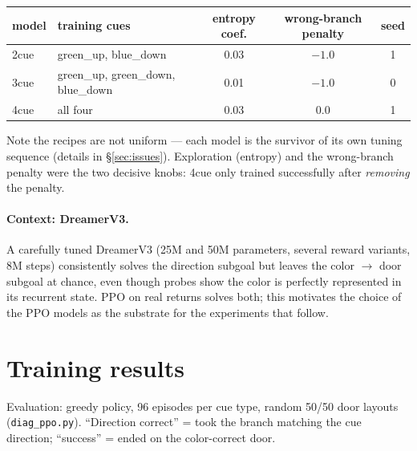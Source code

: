 \documentclass[11pt]{article}
\newcommand{\bad}[1]{\textcolor{warnred}{#1}}
\begin{document}
\begin{center}
\small
\begin{tabular}{llccc}
\toprule
model & training cues & entropy coef. & wrong-branch penalty & seed \\
\midrule
2cue & green\_up, blue\_down & 0.03 & $-1.0$ & 1 \\
3cue & green\_up, green\_down, blue\_down & 0.01 & $-1.0$ & 0 \\
4cue & all four & 0.03 & $0.0$ & 1 \\
\bottomrule
\end{tabular}
\end{center}

\noindent\bad{Note the recipes are not uniform} --- each model is the survivor of its own tuning
sequence (details in \S\ref{sec:issues}). Exploration (entropy) and the wrong-branch penalty were
the two decisive knobs: 4cue only trained successfully after \emph{removing} the penalty.

\paragraph{Context: DreamerV3.} A carefully tuned DreamerV3 (25M and 50M parameters, several
reward variants, 8M steps) consistently solves the direction subgoal but leaves the color
$\rightarrow$ door subgoal at chance, even though probes show the color is perfectly represented
in its recurrent state. PPO on real returns solves both; this motivates the choice of the PPO
models as the substrate for the experiments that follow.

\section{Training results}

Evaluation: greedy policy, 96 episodes per cue type, random 50/50 door layouts
(\texttt{diag\_ppo.py}). ``Direction correct'' = took the branch matching the cue direction;
``success'' = ended on the color-correct door.
\end{document}

